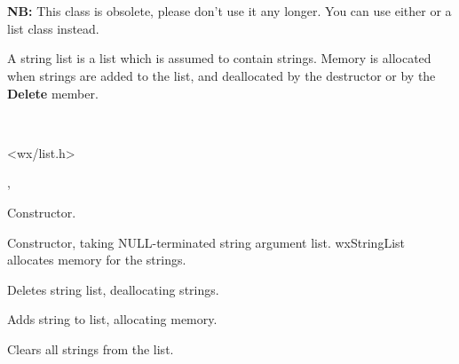 \section{}\label{wxstringlist}

{\bf NB:} This class is obsolete, please don't use it any longer. You can use
either  or a  
list class instead.

A string list is a list which is assumed to contain strings.
Memory is allocated when strings are added to
the list, and deallocated by the destructor or by the {\bf Delete}\rtfsp
member.


\\


<wx/list.h>


, 




Constructor.


Constructor, taking NULL-terminated string argument list. wxStringList
allocates memory for the strings.



Deletes string list, deallocating strings.



Adds string to list, allocating memory.



Clears all strings from the list.



